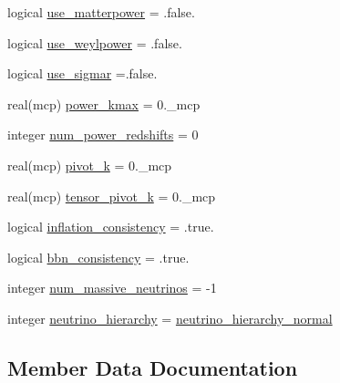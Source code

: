 \begin{DoxyCompactItemize}
\item 
logical \mbox{\hyperlink{structcosmologytypes_1_1tcosmotheoryparams_a0a1c7b66accdbd1805105a3c3dd82e70}{use\+\_\+matterpower}} = .false.
\item 
logical \mbox{\hyperlink{structcosmologytypes_1_1tcosmotheoryparams_acb43c5efaf520d3c9f7242e9dcb3f96c}{use\+\_\+weylpower}} = .false.
\item 
logical \mbox{\hyperlink{structcosmologytypes_1_1tcosmotheoryparams_ab2615923d8dca0a31a5843ac56d2ac6e}{use\+\_\+sigmar}} =.false.
\item 
real(mcp) \mbox{\hyperlink{structcosmologytypes_1_1tcosmotheoryparams_ad3a05b2437b676b3dd3f9e05e83ef4b2}{power\+\_\+kmax}} = 0.\+\_\+mcp
\item 
integer \mbox{\hyperlink{structcosmologytypes_1_1tcosmotheoryparams_a1d014b5989b1452d1ca6196af40724a2}{num\+\_\+power\+\_\+redshifts}} = 0
\item 
real(mcp) \mbox{\hyperlink{structcosmologytypes_1_1tcosmotheoryparams_abf509589f917be2d3e69ac658a123c99}{pivot\+\_\+k}} = 0.\+\_\+mcp
\item 
real(mcp) \mbox{\hyperlink{structcosmologytypes_1_1tcosmotheoryparams_a0808f20c9d2ce82cc0130786a8863807}{tensor\+\_\+pivot\+\_\+k}} = 0.\+\_\+mcp
\item 
logical \mbox{\hyperlink{structcosmologytypes_1_1tcosmotheoryparams_ad8260575d7cb03140f80cb9efed3d076}{inflation\+\_\+consistency}} = .true.
\item 
logical \mbox{\hyperlink{structcosmologytypes_1_1tcosmotheoryparams_a3cd9dc552c277d19ae45255835bbdfe1}{bbn\+\_\+consistency}} = .true.
\item 
integer \mbox{\hyperlink{structcosmologytypes_1_1tcosmotheoryparams_a2c037d6c04a84d23aa30ac53f3032ed2}{num\+\_\+massive\+\_\+neutrinos}} = -\/1
\item 
integer \mbox{\hyperlink{structcosmologytypes_1_1tcosmotheoryparams_a47d315560dc21cf0a8192a272baf27a6}{neutrino\+\_\+hierarchy}} = \mbox{\hyperlink{namespacecosmologytypes_ac77eac54651ec04a99342a063e413398}{neutrino\+\_\+hierarchy\+\_\+normal}}
\end{DoxyCompactItemize}


\subsection{Member Data Documentation}
\mbox{\label{structcosmologytypes_1_1tcosmotheoryparams_a3cd9dc552c277d19ae45255835bbdfe1}} 
